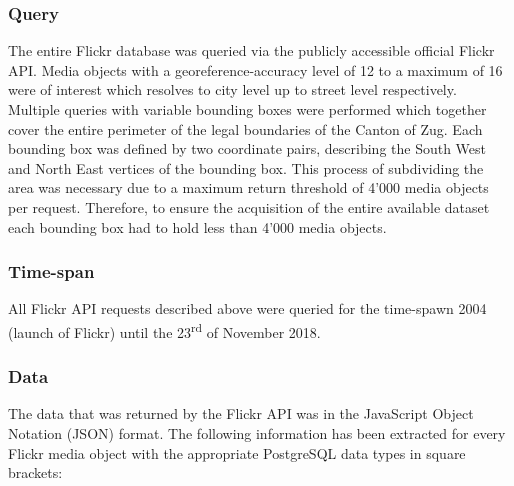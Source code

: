 \subsubsection{Query} \label{flickr_query}
The entire Flickr database was queried via the publicly accessible official Flickr API. Media objects with a georeference-accuracy level of 12 to a maximum of 16 were of interest which resolves to city level up to street level respectively. Multiple queries with variable bounding boxes were performed which together cover the entire perimeter of the legal boundaries of the Canton of Zug. Each bounding box was defined by two coordinate pairs, describing the South West and North East vertices of the bounding box. This process of subdividing the area was necessary due to a maximum return threshold of 4'000 media objects per request. Therefore, to ensure the acquisition of the entire available dataset each bounding box had to hold less than 4'000 media objects.

\subsubsection{Time-span} \label{flickr_timespan}
All Flickr API requests described above were queried for the time-spawn 2004 (launch of Flickr) until the 23\textsuperscript{rd} of November 2018.

\subsubsection{Data} \label{flickr_data}
The data that was returned by the Flickr API was in the JavaScript Object Notation (JSON) format. The following information has been extracted for every Flickr media object with the appropriate PostgreSQL data types in square brackets:\\

